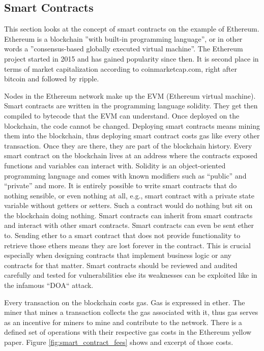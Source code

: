 \subsection{Smart Contracts}
\label{subsec:02_smart_contracts}

This section looks at the concept of smart contracts on the example of Ethereum.
Ethereum is a blockchain ''with built-in programming language'', or in other words a ''consensus-based globally executed virtual machine''.
The Ethereum project started in 2015 and has gained popularity since then. It is second place in terms of market capitalization according to coinmarketcap.com, right after bitcoin and followed by ripple.

Nodes in the Ethereum network make up the EVM (Ethereum virtual machine). Smart contracts are written in the programming language solidity. They get then compiled to bytecode that the EVM can understand.
Once deployed on the blockchain, the code cannot be changed. Deploying smart contracts means mining them into the blockchain, thus deploying smart contract costs gas like every other transaction. Once they are there, they are part of the blockchain history.
Every smart contract on the blockchain lives at an address where the contracts exposed functions and variables can interact with. Solidity is an object-oriented programming language and comes with known modifiers such as ``public'' and ``private'' and more.
It is entirely possible to write smart contracts that do nothing sensible, or even nothing at all, e.g., smart contract with a private state variable without getters or setters.
Such a contract would do nothing but sit on the blockchain doing nothing. Smart contracts can inherit from smart contracts and interact with other smart contracts.
Smart contracts can even be sent ether to. Sending ether to a smart contract that does not provide functionality to retrieve those ethers means they are lost forever in the contract.
This is crucial especially when designing contracts that implement business logic or any contracts for that matter. Smart contracts should be reviewed and audited carefully and tested for vulnerabilities else its weaknesses can be exploited like in the infamous ``DOA`` attack.

Every transaction on the blockchain costs gas. Gas is expressed in ether. The miner that mines a transaction collects the gas associated with it, thus gas serves as an incentive for miners to mine and contribute to the network. There is a defined set of operations with their respective gas costs in the Ethereum yellow paper.
Figure \ref{fig:smart_contract_fees} shows and excerpt of those costs.

